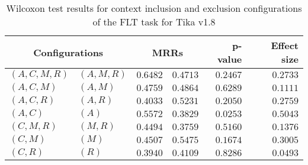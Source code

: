 
\begin{table}
\begin{spacing}{1.2}
\centering
\caption{Wilcoxon test results for context inclusion and exclusion configurations of the FLT task for Tika v1.8}
\label{table:versus-wilcox-tika-flt-context}
\begin{tabular}{ll|rr|rr}
\toprule
      \multicolumn{2}{c|}{Configurations} &          \multicolumn{2}{c|}{MRRs} &       p-value & Effect size \\
\midrule
 $(A,C,M,R)$ &  $(A,M,R)$ & $0.6482$ & $0.4713$ & $0.2467$ &    $0.2733$ \\
   $(A,C,M)$ &    $(A,M)$ & $0.4759$ & $0.4864$ & $0.6289$ &    $0.1111$ \\
   $(A,C,R)$ &    $(A,R)$ & $0.4033$ & $0.5231$ & $0.2050$ &    $0.2759$ \\
     $(A,C)$ &      $(A)$ & $0.5572$ & $0.3829$ & $0.0253$ &    $0.5043$ \\
   $(C,M,R)$ &    $(M,R)$ & $0.4494$ & $0.3759$ & $0.5160$ &    $0.1376$ \\
     $(C,M)$ &      $(M)$ & $0.4507$ & $0.5475$ & $0.1674$ &    $0.3005$ \\
     $(C,R)$ &      $(R)$ & $0.3940$ & $0.4109$ & $0.8286$ &    $0.0493$ \\
\bottomrule
\end{tabular}

\end{spacing}
\end{table}

